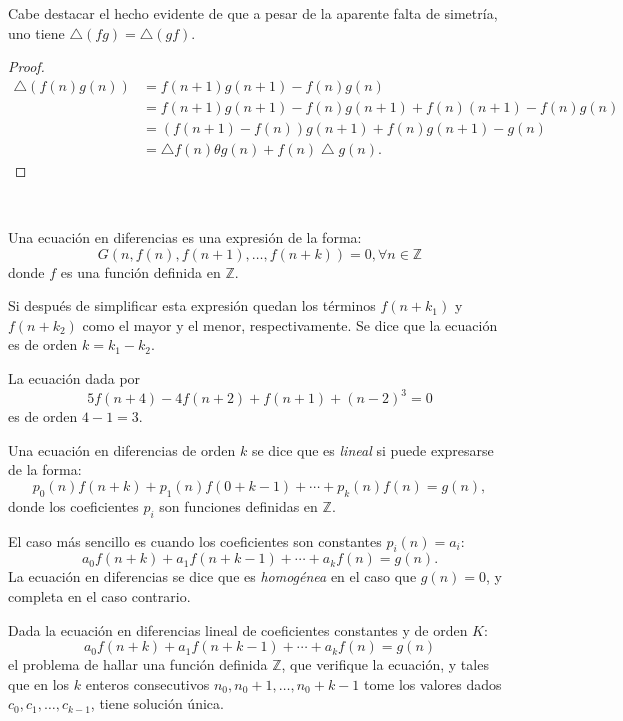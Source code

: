 \begin{remark}
	Cabe destacar el hecho evidente de que a pesar de la aparente falta de simetría, uno tiene $\bigtriangleup\left(fg\right)=\bigtriangleup\left(gf\right)$.
\end{remark}

\begin{proof}
	\begin{align*}
		\bigtriangleup\left(f(n)g(n)\right)
		&=f\left(n+1\right)g\left(n+1\right)-f(n)g(n)\\
		&=f(n+1)g(n+1)-f(n)g(n+1)+f(n)(n+1)-f(n)g(n)\\
		&=(f(n+1)-f(n))g(n+1)+f(n)g(n+1)-g(n)\\
		&=\bigtriangleup f(n)\theta g(n)+f(n)\bigtriangleup g(n).
	\end{align*}
\end{proof}

\

Una ecuación en diferencias es una expresión de la forma: \[ G\left(n,f(n),f(n+1),\ldots,f(n+k)\right)=0,\forall n\in\mathds{Z} \] donde $f$ es una función definida en $\mathds{Z}$.

Si después de simplificar esta expresión quedan los términos $f\left(n+k_{1}\right)$ y $f\left(n+k_{2}\right)$ como el mayor y el menor, respectivamente. Se dice que la ecuación es de orden $k=k_{1}-k_{2}$.

\begin{example}
	La ecuación dada por \[ 5f(n+4)-4f(n+2)+f(n+1)+(n-2)^{3}=0 \] es de orden $4-1=3$.
\end{example}

Una ecuación en diferencias de orden $k$ se dice que es \emph{lineal} si puede expresarse de la forma: \[ p_{0}(n)f(n+k)+p_{1}(n)f(0+k-1)+\cdots+p_{k}(n)f(n)=g(n), \] donde los coeficientes $p_{i}$ son funciones definidas en $\mathds{Z}$.

El caso más sencillo es cuando los coeficientes son constantes $p_{i}(n)=a_{i}$: \[ a_{0}f(n+k)+a_{1}f(n+k-1)+\cdots+a_{k}f(n)=g(n). \] La ecuación en diferencias se dice que es \emph{homogénea} en el caso que $g(n)=0$, y completa en el caso contrario.

\begin{theorem}{}
	Dada la ecuación en diferencias lineal de coeficientes constantes y de orden $ K $: \[ a_{0}f(n+k)+a_{1}f(n+k-1)+\cdots+a_{k}f(n)=g(n) \] el problema de hallar una función definida $\mathds{Z}$, que verifique la ecuación, y tales que en los $k$ enteros consecutivos $n_{0},n_{0}+1,\ldots,n_{0}+k-1$ tome los valores dados $c_{0},c_{1},\ldots,c_{k-1}$, tiene solución única.
\end{theorem}

